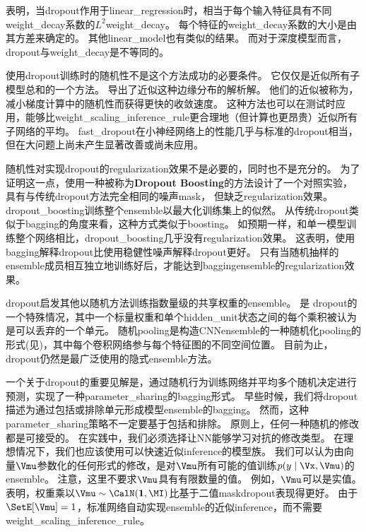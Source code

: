 \cite{Wager-et-al-2013}表明，当\gls{dropout}作用于\gls{linear_regression}时，相当于每个输入特征具有不同\gls{weight_decay}系数的$L^2$\gls{weight_decay}。 每个特征的\gls{weight_decay}系数的大小是由其方差来确定的。
其他\gls{linear_model}也有类似的结果。
而对于深度模型而言，\gls{dropout}与\gls{weight_decay}是不等同的。


使用\gls{dropout}训练时的随机性不是这个方法成功的必要条件。
它仅仅是近似所有子模型总和的一个方法。
\cite{Wang-Manning-2013}导出了近似这种边缘分布的解析解。
他们的近似被称为，减小梯度计算中的随机性而获得更快的收敛速度。
这种方法也可以在测试时应用，能够比\gls{weight_scaling_inference_rule}更合理地（但计算也更昂贵）近似所有子网络的平均。
\gls{fast_dropout}在小神经网络上的性能几乎与标准的\gls{dropout}相当，但在大问题上尚未产生显著改善或尚未应用。


随机性对实现\gls{dropout}的\gls{regularization}效果不是必要的，同时也不是充分的。
为了证明这一点，\cite{WardeFarley-et-al-2014}使用一种被称为\textbf{Dropout Boosting}的方法设计了一个对照实验，具有与传统\gls{dropout}方法完全相同的噪声\gls{mask}， 但缺乏\gls{regularization}效果。
\gls{dropout_boosting}训练整个\gls{ensemble}以最大化训练集上的似然。
从传统\gls{dropout}类似于\gls{bagging}的角度来看，这种方式类似于\gls{boosting}。
如预期一样，和单一模型训练整个网络相比，\gls{dropout_boosting}几乎没有\gls{regularization}效果。
这表明，使用\gls{bagging}解释\gls{dropout}比使用稳健性噪声解释\gls{dropout}更好。
只有当随机抽样的\gls{ensemble}成员相互独立地训练好后，才能达到\gls{bagging}\gls{ensemble}的\gls{regularization}效果。

\gls{dropout}启发其他以随机方法训练指数量级的共享权重的\gls{ensemble}。
是
\gls{dropout}的一个特殊情况，其中一个标量权重和单个\gls{hidden_unit}状态之间的每个乘积被认为是可以丢弃的一个单元\citep{Wan-et-al-2013}。
随机\gls{pooling}是构造\gls{CNN}\gls{ensemble}的一种随机化\gls{pooling}的形式(见)，其中每个卷积网络参与每个特征图的不同空间位置。
目前为止，\gls{dropout}仍然是最广泛使用的隐式\gls{ensemble}方法。

一个关于\gls{dropout}的重要见解是，通过随机行为训练网络并平均多个随机决定进行预测，实现了一种\gls{parameter_sharing}的\gls{bagging}形式。
早些时候，我们将\gls{dropout}描述为通过包括或排除单元形成模型\gls{ensemble}的\gls{bagging}。
然而，这种\gls{parameter_sharing}策略不一定要基于包括和排除。
原则上，任何一种随机的修改都是可接受的。
在实践中，我们必须选择让\gls{NN}能够学习对抗的修改类型。
在理想情况下，我们也应该使用可以快速近似\gls{inference}的模型族。
我们可以认为由向量$\Vmu$参数化的任何形式的修改，是对$\Vmu$所有可能的值训练$p(y \mid \Vx, \Vmu)$的\gls{ensemble}。
注意，这里不要求$\Vmu$具有有限数量的值。
例如，$\Vmu$可以是实值。
\cite{Srivastava-et-al-2014}表明，权重乘以$\Vmu \sim \CalN(\mathbf{1}, \MI)$比基于二值\gls{mask}\gls{dropout}表现得更好。
由于$\SetE[\Vmu] = 1$，标准网络自动实现\gls{ensemble}的近似\gls{inference}，而不需要\gls{weight_scaling_inference_rule}。

